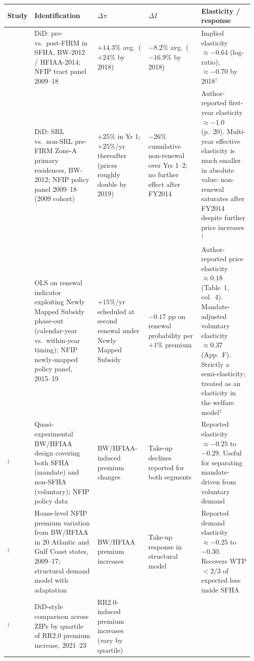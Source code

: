 \documentclass[11pt]{article}
\begin{document}
\begin{landscape}
\renewcommand{\arraystretch}{1.3}
\footnotesize
\begin{tabular}{p{3cm} p{4.5cm} p{3.5cm} p{3.5cm} p{6cm}}
\toprule
\textbf{Study} & \textbf{Identification} & \textbf{$\Delta\pi$} & \textbf{$\Delta I$} & \textbf{Elasticity / response} \\
\midrule
\citet{hennighausen2023}
& DiD: pre- vs.\ post-FIRM in SFHA, BW-2012 / HFIAA-2014; NFIP tract panel 2009--18
& $+14.3\%$ avg.\ ($+24\%$ by 2018)
& $-8.2\%$ avg.\ ($-16.9\%$ by 2018)
& Implied elasticity $\approx -0.64$ (log-ratio); $\approx -0.70$ by 2018$^\dagger$ \\
\citet{collier2026}
& DiD: SRL vs.\ non-SRL pre-FIRM Zone-A primary residences, BW-2012; NFIP policy panel 2009--18 (2009 cohort)
& $+25\%$ in Yr 1; $+25\%$/yr thereafter (prices roughly double by 2019)
& $-26\%$ cumulative non-renewal over Yrs 1--2; no further effect after FY2014
& Author-reported first-year elasticity $\approx -1.0$ (p.~20). Multi-year effective elasticity is much smaller in absolute value: non-renewal saturates after FY2014 despite further price increases$^\dagger$ \\
\citet{mulder2024}
& OLS on renewal indicator exploiting Newly Mapped Subsidy phase-out (calendar-year vs.\ within-year timing); NFIP newly-mapped policy panel, 2015--19
& $+15\%$/yr scheduled at second renewal under Newly Mapped Subsidy
& $-0.17$ pp on renewal probability per $+1\%$ premium
& Author-reported price elasticity $\approx 0.18$ (Table~1, col.~4). Mandate-adjusted voluntary elasticity $\approx 0.37$ (App.~F). Strictly a semi-elasticity; treated as an elasticity in the welfare model$^\dagger$ \\
\citet{bradt2021}$^\ddagger$
& Quasi-experimental BW/HFIAA design covering both SFHA (mandate) and non-SFHA (voluntary); NFIP policy data
& BW/HFIAA-induced premium changes
& Take-up declines reported for both segments
& Reported elasticity $\approx -0.25$ to $-0.29$. Useful for separating mandate-driven from voluntary demand \\
\citet{wagner2022}$^\ddagger$
& House-level NFIP premium variation from BW/HFIAA in 20 Atlantic and Gulf Coast states, 2009--17; structural demand model with adaptation
& BW/HFIAA premium increases
& Take-up response in structural model
& Reported demand elasticity $\approx -0.25$ to $-0.30$. Recovers WTP $<2/3$ of expected loss inside SFHA \\
\citet{gourevitch2025}$^\ddagger$
& DiD-style comparison across ZIPs by quartile of RR2.0 premium increase, 2021--23
& RR2.0-induced premium increases (vary by quartile)

\end{tabular}
\end{landscape}
\end{document}
